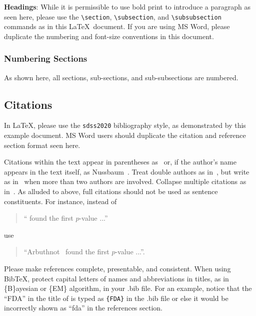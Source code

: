 \documentclass[10pt]{article}
\begin{document}
{\bf Headings}: While it is permissible to use bold print to introduce a paragraph
as seen here, please use the \verb+\section+,
\verb+\subsection+, and \verb+\subsubsection+
commands as in this \LaTeX\ document.  If you are using MS Word, please duplicate
the numbering and font-size conventions in this document.

\subsubsection{Numbering Sections}
As shown here, all sections, sub-sections, and sub-subsections are numbered.

\subsection{Citations}

In \LaTeX, please use the
  {\tt sdss2020} bibliography style, as demonstrated by this example document.
MS Word users should duplicate the citation and reference section format seen here.

Citations within the text appear in parentheses
as~\cite{Nussbaum2018} or, if the author's name appears in the text
itself, as Nussbaum~.  Treat double authors as
in~\cite{Wasserstein2016}, but write as in~\cite{Brunner} when more than two
authors are involved. Collapse multiple citations as
in~\cite{LaVange2019,Wasserstein2016}.  As alluded to above, full citations should not
be used as sentence constituents.  For instance, instead of
\begin{quote}
  ``\cite{Arbuthnot1710} found the first $p$-value ...''
\end{quote}
use
\begin{quote}
  ``Arbuthnot~ found the first $p$-value ...''.
\end{quote}
Please make references complete, presentable, and
consistent. When using Bib\TeX, protect capital letters of names and
abbreviations in titles, as in \{B\}ayesian or \{EM\} algorithm,
in your .bib file.  For an example, notice that the ``FDA'' in
the title of \cite{LaVange2019} is typed as \verb+{FDA}+ in the .bib file
or else it would be incorrectly shown as ``fda'' in the references section.
\end{document}
